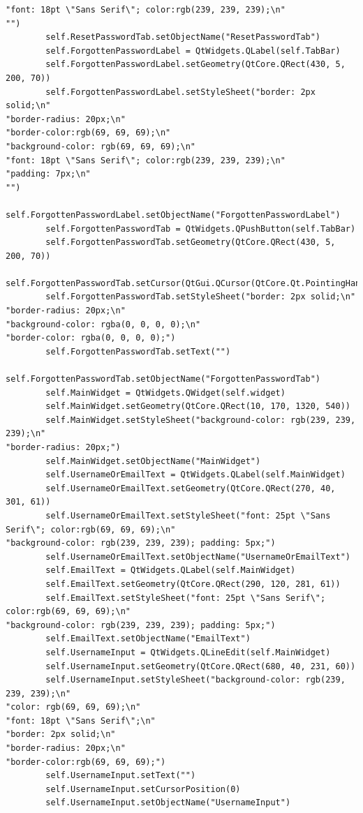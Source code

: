 \documentclass{article}
\begin{document}
\begin{lstlisting}
"font: 18pt \"Sans Serif\"; color:rgb(239, 239, 239);\n"
"")
        self.ResetPasswordTab.setObjectName("ResetPasswordTab")
        self.ForgottenPasswordLabel = QtWidgets.QLabel(self.TabBar)
        self.ForgottenPasswordLabel.setGeometry(QtCore.QRect(430, 5, 200, 70))
        self.ForgottenPasswordLabel.setStyleSheet("border: 2px solid;\n"
"border-radius: 20px;\n"
"border-color:rgb(69, 69, 69);\n"
"background-color: rgb(69, 69, 69);\n"
"font: 18pt \"Sans Serif\"; color:rgb(239, 239, 239);\n"
"padding: 7px;\n"
"")
        self.ForgottenPasswordLabel.setObjectName("ForgottenPasswordLabel")
        self.ForgottenPasswordTab = QtWidgets.QPushButton(self.TabBar)
        self.ForgottenPasswordTab.setGeometry(QtCore.QRect(430, 5, 200, 70))
        self.ForgottenPasswordTab.setCursor(QtGui.QCursor(QtCore.Qt.PointingHandCursor))
        self.ForgottenPasswordTab.setStyleSheet("border: 2px solid;\n"
"border-radius: 20px;\n"
"background-color: rgba(0, 0, 0, 0);\n"
"border-color: rgba(0, 0, 0, 0);")
        self.ForgottenPasswordTab.setText("")
        self.ForgottenPasswordTab.setObjectName("ForgottenPasswordTab")
        self.MainWidget = QtWidgets.QWidget(self.widget)
        self.MainWidget.setGeometry(QtCore.QRect(10, 170, 1320, 540))
        self.MainWidget.setStyleSheet("background-color: rgb(239, 239, 239);\n"
"border-radius: 20px;")
        self.MainWidget.setObjectName("MainWidget")
        self.UsernameOrEmailText = QtWidgets.QLabel(self.MainWidget)
        self.UsernameOrEmailText.setGeometry(QtCore.QRect(270, 40, 301, 61))
        self.UsernameOrEmailText.setStyleSheet("font: 25pt \"Sans Serif\"; color:rgb(69, 69, 69);\n"
"background-color: rgb(239, 239, 239); padding: 5px;")
        self.UsernameOrEmailText.setObjectName("UsernameOrEmailText")
        self.EmailText = QtWidgets.QLabel(self.MainWidget)
        self.EmailText.setGeometry(QtCore.QRect(290, 120, 281, 61))
        self.EmailText.setStyleSheet("font: 25pt \"Sans Serif\"; color:rgb(69, 69, 69);\n"
"background-color: rgb(239, 239, 239); padding: 5px;")
        self.EmailText.setObjectName("EmailText")
        self.UsernameInput = QtWidgets.QLineEdit(self.MainWidget)
        self.UsernameInput.setGeometry(QtCore.QRect(680, 40, 231, 60))
        self.UsernameInput.setStyleSheet("background-color: rgb(239, 239, 239);\n"
"color: rgb(69, 69, 69);\n"
"font: 18pt \"Sans Serif\";\n"
"border: 2px solid;\n"
"border-radius: 20px;\n"
"border-color:rgb(69, 69, 69);")
        self.UsernameInput.setText("")
        self.UsernameInput.setCursorPosition(0)
        self.UsernameInput.setObjectName("UsernameInput")

\end{lstlisting}
\end{document}
